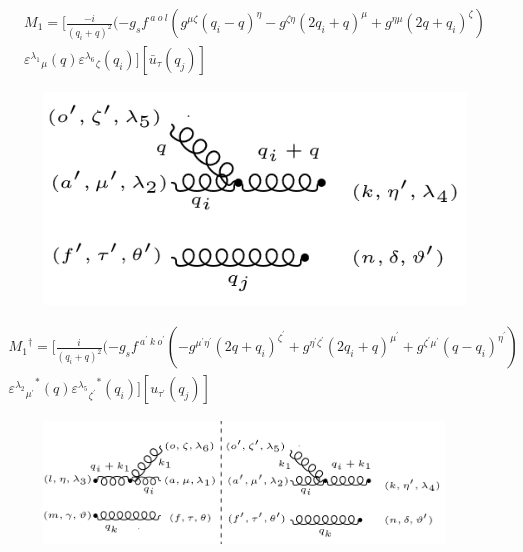 \begin{equation}
\begin{split}
M_1=[\frac{-i}{(q_i +q)^2}(-g_s f^{\:a\:o\:l}(g^{{\mu}{\zeta}}(q_i-q)^{\eta}-g^{{\zeta}{\eta}}(2q_i +q)^{\mu}+g^{{\eta}{\mu}}(2q +q_i)^{\zeta})\\
{\varepsilon^{\lambda_1}}_{\mu} (q) {\varepsilon^{\lambda_6}}_{\zeta} (q_i)][\bar{u}_{\tau}(q_j)]
\end{split}
\end{equation}
\begin{figure}[ht!]
\centering
\includegraphics[scale=0.7]{images/GG/M1Daggergg.png}
\end{figure}
\begin{equation}
\begin{split}
{M_1}^{\dagger}=[\frac{i}{(q_i +q)^2}(-g_s f^{\:a^{\prime}\:k\: o^{\prime}}(-g^{{{\mu}^{\prime}}{{\eta}^{\prime}}}(2q+q_i)^{{\zeta}^{\prime}}+g^{{{\eta}^{\prime}}{{\zeta}^{\prime}}}(2q_i +q)^{{\mu}^{\prime}}+g^{{{\zeta}^{\prime}}{{\mu}^{\prime}}}(q-q_i)^{{\eta}^{\prime}})\\
{{\varepsilon^{\lambda_2}}_{{\mu}^{\prime}}}^* (q) {{\varepsilon^{\lambda_5}}_{{\zeta}^{\prime}}}^* (q_i)][{u}_{{\tau}^{\prime}}(q_j)]
\end{split}
\end{equation}
\begin{figure}[ht!]
\centering
\includegraphics[width=0.95\textwidth]{images/GG/M1Squer.png}
\end{figure}
